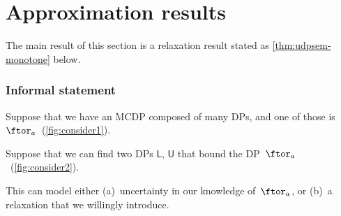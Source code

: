 \section{Approximation results\label{sec:Approximation-results}}

The main result of this section is a relaxation result stated as \cref{thm:udpsem-monotone}
below.

\subsubsection*{Informal statement}

Suppose that we have an MCDP composed of many DPs, and one of those
is~$\ftor_{a}$~(\cref{fig:consider1}).


\noindent Suppose that we can find two DPs $\boldsymbol{\mathsf{L}}$,
$\boldsymbol{\mathsf{U}}$ that bound the DP~$\ftor_{a}$~(\cref{fig:consider2}).


\noindent This can model either (a)~uncertainty in our knowledge
of~$\ftor_{a}$, or (b)~a relaxation that we willingly introduce.

